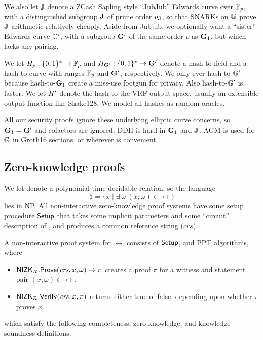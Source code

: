 We also let ${\mathbb{J}}$ denote a ZCash Sapling style ``JubJub'' Edwards curve
over $\mathbb{F}_p$, with a distinguished subgroup ${\mathbf{J}}$ of prime order $p_{\mathbf{J}}$,
so that SNARKs on ${\mathbb{G}}$ prove ${\mathbf{J}}$ arithmetic relatively cheaply.
Aside from Jubjub, we optionally want a ``sister'' Edwards curve ${\mathbb{G}'}$,
with a subgroup ${\mathbf{G}}'$ of the same order $p$ as ${\mathbf{G}}_1$,
 but which lacks any pairing.

We let $H_p : \{0,1\}^* \to \mathbb{F}_p$ and $H_{{\mathbf{G}'}} : \{0,1\}^* \to {\mathbf{G}'}$
denote a hash-to-field and a hash-to-curve with ranges $\mathbb{F}_p$ and ${\mathbf{G}'}$, respectively.  
We only ever hash-to-${\mathbb{G}'}$ because hash-to-${\mathbf{G}}_1$ create a miss-use
footgun for privacy.  Also hash-to-${\mathbb{G}'}$ is faster.
We let $H'$ denote the hash to the VRF output space,
 usually an extensible output function like Shake128.
We model all hashes as random oracles.

All our security proofs ignore these underlying elliptic curve concerns,
so ${\mathbf{G}}_1 = {\mathbf{G}'}$ and cofactors are ignored. DDH is hard in ${\mathbf{G}}_1$ and ${\mathbf{J}}$.
AGM is used for ${\mathbb{G}}$ in Groth16 sections, or wherever is convenient. 

\subsection{Zero-knowledge proofs}
\label{subsec:zkp_background}

% 

We let \rel denote a polynomial time decidable relation, so the language
$$\lang = \{x \mid \exists \ \omega \ (x; \omega) \in \rel \}$$ lies in NP.
All non-interactive zero-knowledge proof systems have some setup procedure
${\mathsf{Setup}}$ that takes some implicit parameters and some ``circuit''
description of \rel, and produces a common reference string ($\mathit{crs}$).

A non-interactive proof system for $\rel$ consists of ${\mathsf{Setup}}$, \Prove and \Verify PPT algorithms, where
\begin{itemize}
\item ${\mathsf{NIZK}}_\mathcal{R}.{\mathsf{Prove}}(\mathit{crs}, x, \omega) \mapsto \pi$ creates a proof $\pi$ for a witness and statement pair $(x; \omega) \in \rel$.
\item ${\mathsf{NIZK}}_\mathcal{R}.{\mathsf{Verify}}(\mathit{crs}, x, \pi)$ returns either true of false, depending upon whether $\pi$  proves $x$.
\end{itemize}	
which satisfy the following completeness, zero-knowledge, and knowledge soundness definitions.

